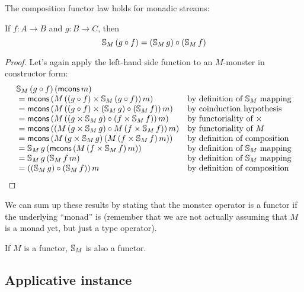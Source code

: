\begin{lemma}\label{lemma:functor_comp}
The composition functor law holds for monadic streams:

If $f:A\rightarrow B$ and $g:B\rightarrow C$, then
$$
\mathbb{S}_{M}\,(g\circ f) = (\mathbb{S}_{M}\,g) \circ (\mathbb{S}_{M}\,f)
$$
\end{lemma}
\begin{proof}
Let's again apply the left-hand side function to an $M$-monster in constructor form:
$$
\begin{array}{ll}
\mathbb{S}_{M}\,(g\circ f)\,(\mathsf{mcons}\,m)\\
{}= \mathsf{mcons}\,(M\,((g\circ f)\times \mathbb{S}_{M}\,(g\circ f))\,m)
  & \mbox{by definition of }\mathbb{S}_{M}\mbox{ mapping}\\
{}= \mathsf{mcons}\,(M\,((g\circ f)\times (\mathbb{S}_{M}\,g) \circ (\mathbb{S}_{M}\,f))\,m)
  & \mbox{by coinduction hypothesis}\\ 
{}= \mathsf{mcons}\,(M\,((g\times \mathbb{S}_{M}\,g) \circ (f\times \mathbb{S}_{M}\,f))\,m)
  & \mbox{by functoriality of }\times\\ 
{}= \mathsf{mcons}\,((M\,(g\times \mathbb{S}_{M}\,g) \circ M\,(f\times \mathbb{S}_{M}\,f))\,m)
  & \mbox{by functoriality of }M\\ 
{}= \mathsf{mcons}\,(M\,(g\times \mathbb{S}_{M}\,g)\, (M\,(f\times \mathbb{S}_{M}\,f)\,m))
  & \mbox{by definition of composition}\\ 
{}= \mathbb{S}_{M}\,g\, (\mathsf{mcons}\,(M\,(f\times \mathbb{S}_{M}\,f)\,m))
  & \mbox{by definition of }\mathbb{S}_{M}\mbox{ mapping}\\ 
{}= \mathbb{S}_{M}\,g\, (\mathbb{S}_{M}\,f\,m)
  & \mbox{by definition of }\mathbb{S}_{M}\mbox{ mapping}\\ 
{}= ((\mathbb{S}_{M}\,g) \circ (\mathbb{S}_{M}\,f))\,m
  & \mbox{by definition of composition}
\end{array}
$$
\end{proof}

We can sum up these results by stating that the monster operator is a functor if the underlying ``monad'' is (remember that we are not actually assuming that $M$ is a monad yet, but just a type operator).

\begin{theorem}
If $M$ is a functor, $\mathbb{S}_{M}$ is also a functor.
\end{theorem}

\subsection{Applicative instance}

